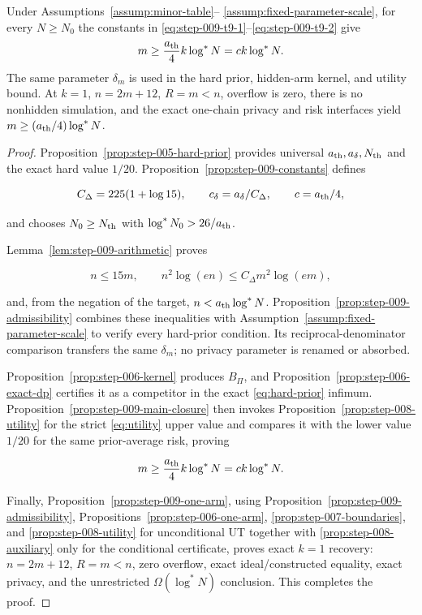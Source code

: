 \begin{proposition}
\label{prop:step-009-result}
Under Assumptions~\ref{assump:minor-table}--
\ref{assump:fixed-parameter-scale}, for every $N\geq N_0$ the constants
in \eqref{eq:step-009-t9-1}--\eqref{eq:step-009-t9-2} give
\[
m\geq\frac{a_{\rm th}}4k\log^*N=c k\log^*N.
\]
The same parameter $\delta_m$ is used in the hard prior, hidden-arm
kernel, and utility bound.  At $k=1$, $n=2m+12$, $R=m<n$, overflow is
zero, there is no nonhidden simulation, and the exact one-chain privacy
and risk interfaces yield $m\geq(a_{\rm th}/4)\log^*N$.
\end{proposition}
\begin{proof}

Proposition~\ref{prop:step-005-hard-prior} provides universal
\(a_{\rm th},a_\delta,N_{\rm th}\) and the exact hard value \(1/20\).
Proposition~\ref{prop:step-009-constants} defines

\[
C_\Delta=225(1+\log15),
\qquad
c_\delta=a_\delta/C_\Delta,
\qquad
c=a_{\rm th}/4,
\]

and chooses \(N_0\ge N_{\rm th}\) with
\(\log^*N_0>26/a_{\rm th}\).

Lemma~\ref{lem:step-009-arithmetic} proves

\[
n\le15m,
\qquad
n^2\log(en)\le C_\Delta m^2\log(em),
\]

and, from the negation of the target,
\(n<a_{\rm th}\log^*N\).  Proposition~\ref{prop:step-009-admissibility}
combines these inequalities with
Assumption~\ref{assump:fixed-parameter-scale} to verify every hard-prior
condition.  Its reciprocal-denominator comparison transfers the same
\(\delta_m\); no privacy parameter is renamed or absorbed.

Proposition~\ref{prop:step-006-kernel} produces \(B_\Pi\), and 
Proposition~\ref{prop:step-006-exact-dp} certifies it as a competitor in
the exact \eqref{eq:hard-prior} infimum.  Proposition~\ref{prop:step-009-main-closure}
then invokes Proposition~\ref{prop:step-008-utility} for the 
strict \eqref{eq:utility} upper value and compares it with the lower value
\(1/20\) for the same prior-average risk, proving

\[
m\ge\frac{a_{\rm th}}4k\log^*N
=c k\log^*N.
\]

Finally, Proposition~\ref{prop:step-009-one-arm}, using
Proposition~\ref{prop:step-009-admissibility},
Propositions~\ref{prop:step-006-one-arm},
\ref{prop:step-007-boundaries}, and
\ref{prop:step-008-utility} for unconditional UT together with
\ref{prop:step-008-auxiliary} only for the conditional certificate,
proves exact \(k=1\)
recovery: \(n=2m+12\), \(R=m<n\), zero overflow, exact
ideal/constructed equality, exact privacy, and the unrestricted
\(\Omega(\log^*N)\) conclusion.  This completes the proof.

\end{proof}

